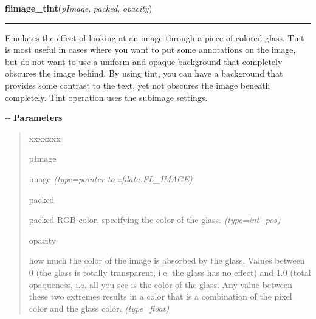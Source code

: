     \label{xformslib:flflimage:flimage_tint}

    \vspace{0.5ex}

\hspace{.8\funcindent}\begin{boxedminipage}{\funcwidth}

    \raggedright \textbf{flimage\_tint}(\textit{pImage}, \textit{packed}, \textit{opacity})

    \vspace{-1.5ex}

    \rule{\textwidth}{0.5\fboxrule}
\setlength{\parskip}{2ex}

Emulates the effect of looking at an image through a piece of colored
glass. Tint is most useful in cases where you want to put some annotations
on the image, but do not want to use a uniform and opaque background that
completely obscures the image behind. By using tint, you can have a
background that provides some contrast to the text, yet not obscures the
image beneath completely. Tint operation uses the subimage settings.

-{}-
\setlength{\parskip}{1ex}
      \textbf{Parameters}
      \vspace{-1ex}

      \begin{quote}
        \begin{Ventry}{xxxxxxx}

          \item[pImage]


image
            {\it (type=pointer to xfdata.FL\_IMAGE)}

          \item[packed]


packed RGB color, specifying the color of the glass.
            {\it (type=int\_pos)}

          \item[opacity]


how much the color of the image is absorbed by the glass. Values
between 0 (the glass is totally transparent, i.e. the glass has no
effect) and 1.0 (total opaqueness, i.e. all you see is the color of
the glass. Any value between these two extremes results in a color
that is a combination of the pixel color and the glass color.
            {\it (type=float)}

        \end{Ventry}


\end{quote}
\end{boxedminipage}
